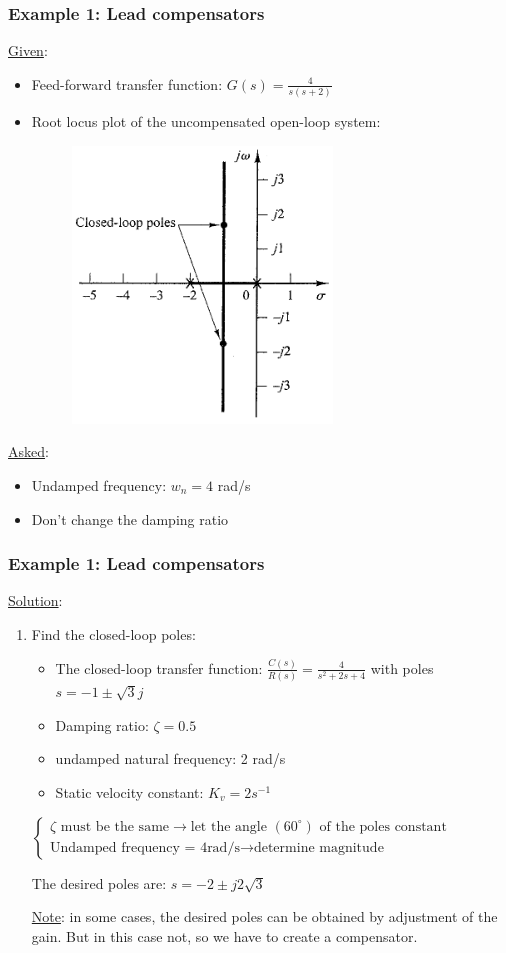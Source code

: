 \begin{frame}
	\frametitle{Example 1: Lead compensators}
	\underline{Given}:
	\begin{itemize}
		\item Feed-forward transfer function: $G(s)=\frac{4}{s(s+2)}$
		\item Root locus plot of the uncompensated open-loop system:
		\begin{figure}
			\centering
			\includegraphics[width=0.3\linewidth]{Ex1_rootlocus}
		\end{figure}
	\end{itemize}
	\underline{Asked}:
	\begin{itemize}
		\item Undamped frequency: $w_n=4$ rad/s
		\item Don't change the damping ratio
	\end{itemize}
\end{frame}

\begin{frame}
	\frametitle{Example 1: Lead compensators}
	\underline{Solution}:
	\begin{enumerate}
		\item Find the closed-loop poles: 
		\begin{itemize}
			\item The closed-loop transfer function: $\frac{C(s)}{R(s)}=\frac{4}{s^2+2s+4}$ with poles $s=-1\pm\sqrt{3}j$
			\item Damping ratio: $\zeta=0.5$
			\item undamped natural frequency: 2 rad/s
			\item Static velocity constant: $K_v=2s^{-1}$
		\end{itemize}
		\vspace{3mm}
		$\begin{cases}
			\zeta \text{ must be the same} \rightarrow \text{let the angle } (60^{\circ}) \text{ of the poles constant}\\
			\text{Undamped frequency = 4rad/s} \rightarrow \text{determine magnitude}
		\end{cases}$
		\vspace{1mm}
		
		The desired poles are: $s=-2\pm j2\sqrt{3}$
		\vspace{3mm}
		
		\underline{Note}: in some cases, the desired poles can be obtained by adjustment of the gain. But in this case not, so we have to create a compensator. 
	\end{enumerate}
\end{frame}

